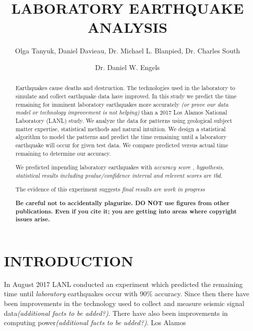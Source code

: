 \documentclass[]{llncs}
\begin{document}

\title{LABORATORY EARTHQUAKE ANALYSIS}

\author{Olga Tanyuk, Daniel Davieau, Dr. Michael L. Blanpied, Dr. Charles South \and Dr. Daniel W. Engels}


\maketitle

\begin{abstract}
Earthquakes cause deaths and destruction.  The technologies used in the laboratory to simulate and collect earthquake data have improved. In this study we predict the time remaining for imminent laboratory earthquakes more accurately {\em (or prove our data model or technology improvement is not helping)} than a 2017 Los Alamos National Laboratory (LANL) study\cite{Bertrand}.  We analyze the data for patterns using geological subject matter expertise, statistical methods and natural intuition. We design a statistical algorithm to model the patterns and predict the time remaining until a laboratory earthquake will occur for given test data. We compare predicted versus actual time remaining to determine our accuracy.

We predicted impending laboratory earthquakes with {\em accuracy score , hypothesis, statistical results including pvalue/confidence interval and relevent scores are tbd}.

The evidence of this experiment suggests {\em final results are work in progress}

{\bf Be careful not to accidentally plagurize. DO NOT use figures from other publications. Even if you cite it; you are getting into areas where copyright issues arise.}

\end{abstract}
\section{INTRODUCTION}
In August 2017 LANL conducted an experiment which predicted the remaining time until \emph{laboratory} earthquakes occur with 90\% accuracy\cite{Bertrand}. Since then there have been improvements in the technology used to collect and measure seismic signal data{\em (additional facts to be added?)}. There have also been improvements in computing power{\em (additional facts to be added?)}. Los Alamos   \par
\end{document}
